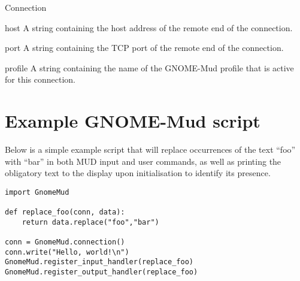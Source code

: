 \documentclass{howto}
\begin{document}
\begin{classdesc}{Connection}{}
\begin{memberdesc}{host}
A string containing the host address of the remote end of the connection.
\end{memberdesc}

\begin{memberdesc}{port}
A string containing the TCP port of the remote end of the connection.
\end{memberdesc}

\begin{memberdesc}{profile}
A string containing the name of the GNOME-Mud profile that is active for this connection.
\end{memberdesc}

\end{classdesc}

\section{Example GNOME-Mud script}
Below is a simple example script that will replace occurrences of the text ``foo'' with ``bar'' in both
MUD input and user commands, as well as printing the obligatory text to the display upon initialisation to identify
its presence.

\begin{verbatim}
import GnomeMud

def replace_foo(conn, data):
    return data.replace("foo","bar")

conn = GnomeMud.connection()
conn.write("Hello, world!\n")
GnomeMud.register_input_handler(replace_foo)
GnomeMud.register_output_handler(replace_foo)
\end{verbatim}
\end{document}
